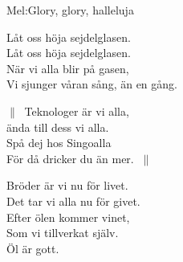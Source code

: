 \begin{SongText}
    \begin{SongInfo}
        Mel:Glory, glory, halleluja
    \end{SongInfo}
    \begin{SongVerse}
        Låt oss höja sejdelglasen.\\%
        Låt oss höja sejdelglasen.\\%
        När vi alla blir på gasen,\\%
        Vi sjunger våran sång, än en gång.
    \end{SongVerse}
    \begin{SongVerse}
        $\|\:$ Teknologer är vi alla,\\%
        ända till dess vi alla.\\%
        Spå dej hos Singoalla\\%
        För då dricker du än mer. $\:\|$
    \end{SongVerse}
    \begin{SongVerse}
        Bröder är vi nu för livet.\\%
        Det tar vi alla nu för givet.\\%
        Efter ölen kommer vinet,\\%
        Som vi tillverkat själv.\\%
        Öl är gott.
    \end{SongVerse}
\end{SongText}
